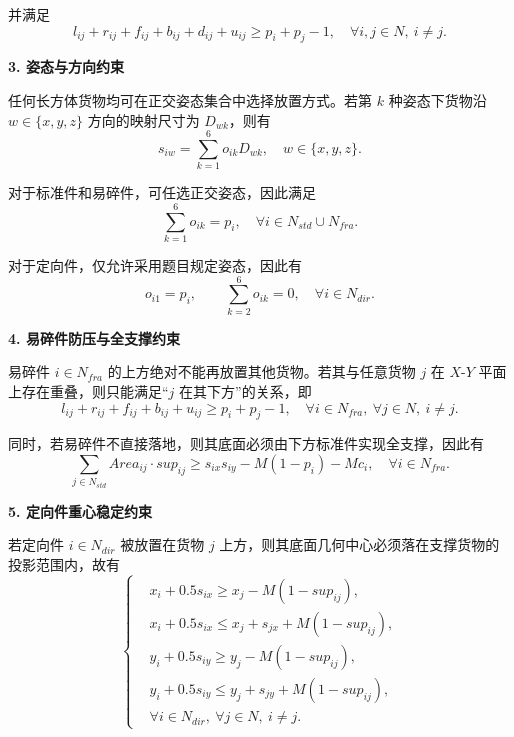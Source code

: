\documentclass{MMCStyle}
\begin{document}
并满足
\begin{equation}
l_{ij}+r_{ij}+f_{ij}+b_{ij}+d_{ij}+u_{ij}\ge p_i+p_j-1,\quad \forall i,j\in N,\ i\neq j.
\end{equation}

\noindent\textbf{3. 姿态与方向约束}

任何长方体货物均可在正交姿态集合中选择放置方式。若第 $k$ 种姿态下货物沿 $w \in \{x,y,z\}$ 方向的映射尺寸为 $D_{wk}$，则有
\begin{equation}
s_{iw}=\sum_{k=1}^{6} o_{ik} D_{wk}, \quad w \in \{x,y,z\}.
\end{equation}

对于标准件和易碎件，可任选正交姿态，因此满足
\begin{equation}
\sum_{k=1}^{6} o_{ik}=p_i, \quad \forall i \in N_{std}\cup N_{fra}.
\end{equation}

对于定向件，仅允许采用题目规定姿态，因此有
\begin{equation}
o_{i1}=p_i,\qquad \sum_{k=2}^{6} o_{ik}=0,\quad \forall i \in N_{dir}.
\end{equation}

\noindent\textbf{4. 易碎件防压与全支撑约束}

易碎件 $i \in N_{fra}$ 的上方绝对不能再放置其他货物。若其与任意货物 $j$ 在 $X$-$Y$ 平面上存在重叠，则只能满足“$j$ 在其下方”的关系，即
\begin{equation}
l_{ij}+r_{ij}+f_{ij}+b_{ij}+u_{ij}\ge p_i+p_j-1,\quad \forall i \in N_{fra},\ \forall j \in N,\ i\neq j.
\end{equation}

同时，若易碎件不直接落地，则其底面必须由下方标准件实现全支撑，因此有
\begin{equation}
\sum_{j \in N_{std}} Area_{ij}\cdot sup_{ij} \ge s_{ix}s_{iy}-M(1-p_i)-Mc_i,\quad \forall i \in N_{fra}.
\end{equation}

\noindent\textbf{5. 定向件重心稳定约束}

若定向件 $i \in N_{dir}$ 被放置在货物 $j$ 上方，则其底面几何中心必须落在支撑货物的投影范围内，故有
\begin{equation}
\left\{
\begin{aligned}
&x_i+0.5s_{ix}\ge x_j-M(1-sup_{ij}),\\
&x_i+0.5s_{ix}\le x_j+s_{jx}+M(1-sup_{ij}),\\
&y_i+0.5s_{iy}\ge y_j-M(1-sup_{ij}),\\
&y_i+0.5s_{iy}\le y_j+s_{jy}+M(1-sup_{ij}),\\
&\forall i \in N_{dir},\ \forall j \in N,\ i \neq j.
\end{aligned}
\right.
\end{equation}
\end{document}
